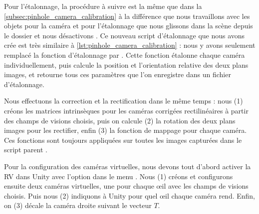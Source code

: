 Pour l'étalonnage, la procédure à suivre est la même que dans la \autoref{subsec:pinhole_camera_calibration} à la différence que nous travaillons avec les objets  pour la caméra et  pour l'étalonnage que nous glissons dans la scène depuis le dossier  et nous désactivons  . Ce nouveau script d'étalonnage que nous avons crée est très similaire à \autoref{lst:pinhole_camera_calibration} : nous y avons seulement remplacé la fonction d'étalonnage par . Cette fonction étalonne chaque caméra individuellement, puis calcule la position et l'orientation relative des deux plans images, et retourne tous ces paramètres que l'on enregistre dans un fichier d'étalonnage.


Nous effectuons la correction et la rectification dans le même temps  : nous (1) créons les matrices intrinsèques pour les caméras corrigées rectilinéaires à partir des champs de visions choisis, puis on calcule (2) la rotation des deux plans images pour les rectifier, enfin (3) la fonction de mappage pour chaque caméra. Ces fonctions sont toujours appliquées sur toutes les images capturées dans le script parent .

Pour la configuration des caméras virtuelles, nous devons tout d'abord activer la RV dans Unity avec l'option  dans le menu . Nous (1) créons et configurons ensuite deux caméras virtuelles, une pour chaque \oe il avec les champs de visions choisis. Puis nous (2) indiquons à Unity pour quel \oe il chaque caméra rend. Enfin, on (3) décale la caméra droite suivant le vecteur $T$.